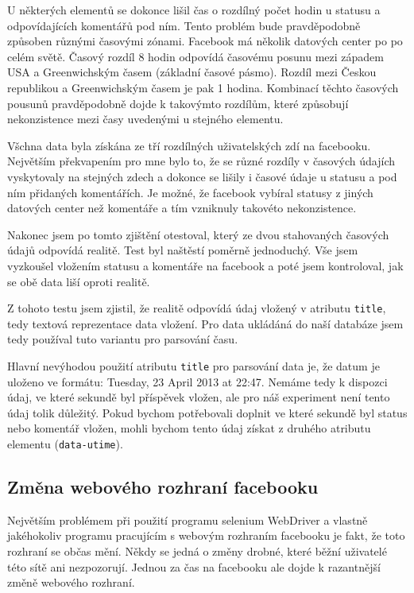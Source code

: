 \documentclass[thesis=M,czech]{FITthesis}[2013/05/10]
\begin{document}
U některých elementů se dokonce lišil čas o rozdílný počet hodin u statusu a odpovídajících komentářů pod ním. Tento problém bude pravděpodobně způsoben různými časovými zónami. Facebook má několik datových center po  po celém světě. Časový rozdíl 8 hodin odpovídá časovému posunu mezi západem USA a Greenwichským časem (základní časové pásmo). Rozdíl mezi Českou republikou a Greenwichským časem je pak 1 hodina. Kombinací těchto časových pousunů pravděpodobně dojde k takovýmto rozdílům, které způsobují nekonzistence mezi časy uvedenými u stejného elementu. 

Všchna data byla získána ze tří rozdílných uživatelských zdí na facebooku. Největším překvapením pro mne bylo to, že se různé rozdíly v časových údajích vyskytovaly na stejných zdech a dokonce se lišily i časové údaje u statusu a pod ním přidaných komentářích.  Je možné, že facebook vybíral statusy z jiných datových center než komentáře a tím vzniknuly takovéto nekonzistence.

Nakonec jsem po tomto zjištění otestoval, který ze dvou stahovaných časových údajů odpovídá realitě. Test byl naštěstí poměrně jednoduchý. Vše jsem vyzkoušel vložením statusu a komentáře na facebook a poté jsem kontroloval, jak se obě data liší oproti realitě. 

Z tohoto testu jsem zjistil, že realitě odpovídá údaj vložený v atributu \verb|title|, tedy textová reprezentace data vložení. Pro data ukládáná do naší databáze jsem tedy používal tuto variantu pro parsování času.

Hlavní nevýhodou použití atributu \verb|title| pro parsování data je, že datum je uloženo ve formátu: Tuesday, 23 April 2013 at 22:47. Nemáme tedy k dispozci údaj, ve které sekundě byl příspěvek vložen, ale pro náš experiment není tento údaj tolik důležitý. Pokud bychom potřebovali doplnit ve které sekundě byl status nebo komentář vložen, mohli bychom tento údaj získat z druhého atributu elementu (\verb|data-utime|). 

\subsection{Změna webového rozhraní facebooku}

Největším problémem při použití programu selenium WebDriver a vlastně jakéhokoliv programu pracujícím s webovým rozhraním facebooku je fakt, že toto rozhraní se občas mění. Někdy se jedná o změny drobné, které běžní uživatelé této sítě ani nezpozorují. Jednou za čas na facebooku ale dojde k razantnější změně webového rozhraní.
\end{document}
